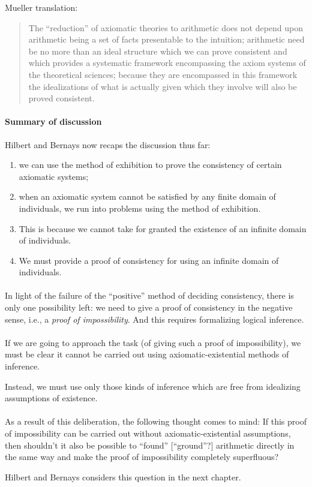 Mueller translation:
\begin{quote}
The ``reduction'' of axiomatic theories to arithmetic does not depend upon
arithmetic being a set of facts presentable to the intuition;
%
arithmetic need be no more than an ideal structure which we can prove
consistent and which provides a systematic framework encompassing the
axiom systems of the theoretical sciences;
%
because they are encompassed in this framework the idealizations of
what is actually given which they involve will also be proved
consistent.
\end{quote}

\paragraph{Summary of discussion}
Hilbert and Bernays now recaps the discussion thus far:
\begin{enumerate}
\item we can use the method of exhibition to prove the consistency of
  certain axiomatic systems;
\item when an axiomatic system cannot be satisfied by any finite
  domain of individuals, we run into problems using the method of exhibition.
\item This is because we cannot take for granted the existence of an
  infinite domain of individuals.
\item We must provide a proof of consistency for using an infinite
  domain of individuals.
\end{enumerate}

\paragraph{}
In light of the failure of the ``positive'' method of deciding
consistency, there is only one possibility left: we need to give a
proof of consistency in the negative sense, i.e., a
\emph{proof of impossibility}.
And this requires formalizing logical inference.

\paragraph{}
If we are going to approach the task (of giving such a proof of
impossibility), we must be clear it cannot be carried out using
axiomatic-existential methods of inference.

Instead, we must use only those kinds of inference which are free from
idealizing assumptions of existence.

\paragraph{}
As a result of this deliberation, the following thought comes to mind:
If this proof of impossibility can be carried out without
axiomatic-existential assumptions, then shouldn't it also be possible
to ``found'' [``ground''?] arithmetic directly in the same way and
make the proof of impossibility completely superfluous?

Hilbert and Bernays considers this question in the next chapter.

